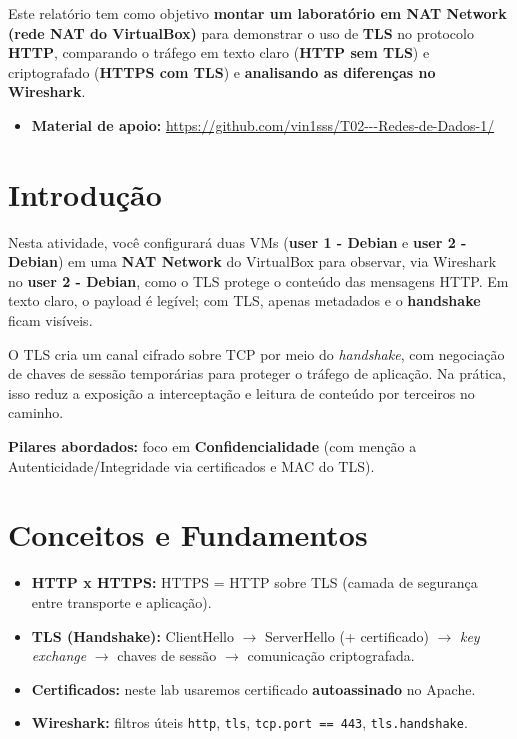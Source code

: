 ﻿





\noindent
Este relatório tem como objetivo \textbf{montar um laboratório em NAT Network (rede NAT do VirtualBox)} para demonstrar o uso de \textbf{TLS} no protocolo \textbf{HTTP}, comparando o tráfego em texto claro (\textbf{HTTP sem TLS}) e criptografado (\textbf{HTTPS com TLS}) e \textbf{analisando as diferenças no Wireshark}.

\begin{itemize}
  \item \textbf{Material de apoio:} \url{https://github.com/vin1sss/T02---Redes-de-Dados-1/}
\end{itemize}


\section{Introdução}

Nesta atividade, você configurará duas VMs (\textbf{user 1 - Debian} e \textbf{user 2 - Debian}) em uma \textbf{NAT Network} do VirtualBox para observar, via Wireshark no \textbf{user 2 - Debian}, como o TLS protege o conteúdo das mensagens HTTP. Em texto claro, o payload é legível; com TLS, apenas metadados e o \textbf{handshake} ficam visíveis.

O TLS cria um canal cifrado sobre TCP por meio do \textit{handshake}, com negociação de chaves de sessão temporárias para proteger o tráfego de aplicação. Na prática, isso reduz a exposição a interceptação e leitura de conteúdo por terceiros no caminho.

\textbf{Pilares abordados:} foco em \textbf{Confidencialidade} (com menção a Autenticidade/Integridade via certificados e MAC do TLS).

\section{Conceitos e Fundamentos}

\begin{itemize}
  \item \textbf{HTTP x HTTPS:} HTTPS = HTTP sobre TLS (camada de segurança entre transporte e aplicação).
  \item \textbf{TLS (Handshake):} ClientHello $\rightarrow$ ServerHello (+ certificado) $\rightarrow$ \textit{key exchange} $\rightarrow$ chaves de sessão $\rightarrow$ comunicação criptografada.
  \item \textbf{Certificados:} neste lab usaremos certificado \textbf{autoassinado} no Apache.
  \item \textbf{Wireshark:} filtros úteis \texttt{http}, \texttt{tls}, \texttt{tcp.port == 443}, \texttt{tls.handshake}.
\end{itemize}

